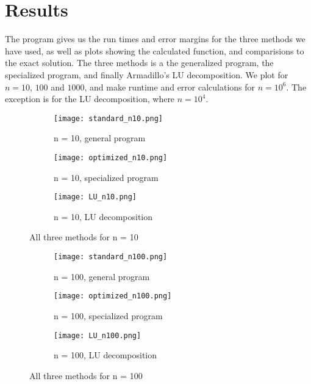 \documentclass[10pt,showpacs,preprintnumbers,footinbib,amsmath,amssymb,aps,prl,twocolumn,groupedaddress,superscriptaddress,showkeys]{revtex4-1}
\begin{document}
\section{Results}

The program gives us the run times and error margins for the three methods we have used, as well as plots showing the calculated function, and comparisions to the exact solution. The three methods is a the generalized program, the specialized program, and finally Armadillo's LU decomposition. We plot for $n = 10$, $100$ and $1000$, and make runtime and error calculations for $n = 10^6$. The exception is for the LU decomposition, where $n = 10^4$.

\begin{figure}
	\centering
	\begin{subfigure}[b]{0.4\textwidth}
		\texttt{[image: standard\_n10.png]}
		\caption{n = 10, general program}
	\end{subfigure}
    \begin{subfigure}[b]{0.4\textwidth}
		\texttt{[image: optimized\_n10.png]}
		\caption{n = 10, specialized program}
	\end{subfigure}
    \begin{subfigure}[b]{0.4\textwidth}
		\texttt{[image: LU\_n10.png]}
		\caption{n = 10, LU decomposition}
	\end{subfigure}
    \caption{All three methods for n = 10}
    \label{figure:n10}
\end{figure}

\begin{figure}
	\centering
	\begin{subfigure}[b]{0.4\textwidth}
		\texttt{[image: standard\_n100.png]}
		\caption{n = 100, general program}
	\end{subfigure}
    \begin{subfigure}[b]{0.4\textwidth}
		\texttt{[image: optimized\_n100.png]}
		\caption{n = 100, specialized program}
	\end{subfigure}
    \begin{subfigure}[b]{0.4\textwidth}
		\texttt{[image: LU\_n100.png]}
		\caption{n = 100, LU decomposition}
	\end{subfigure}
    \caption{All three methods for n = 100}
    \label{figure:n100}
\end{figure}
\end{document}
